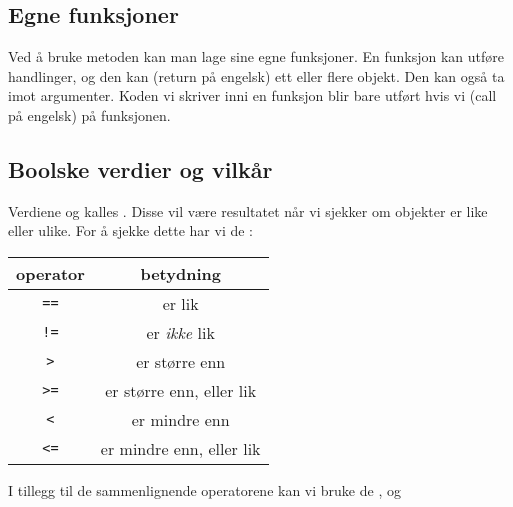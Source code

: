 \newpage
\subsection{Egne funksjoner}
Ved å bruke metoden  kan man lage sine egne funksjoner. En funksjon kan utføre handlinger, og den kan  (return på engelsk) ett eller flere objekt. Den kan også ta imot argumenter. Koden vi skriver inni en funksjon blir bare utført hvis vi  (call på engelsk) på funksjonen. \regv


\subsection{Boolske verdier og vilkår}
Verdiene  og  kalles . Disse vil være resultatet når vi sjekker om objekter er like eller ulike. For å sjekke dette har vi de :
\begin{center}
	\begin{tabular}{c|c}
		\textbf{operator} & \textbf{betydning} \\ \hline
		\texttt{==}	& er lik \\ \rowcolor{gray!10}
		\texttt{!=} & er \textsl{ikke} lik\\
		\texttt{>} & er større enn \\ \rowcolor{gray!10}
		\texttt{>=} & er større enn, eller lik \\
		\texttt{<} & er mindre enn \\ \rowcolor{gray!10}
		\texttt{<=} & er mindre enn, eller lik \\		
	\end{tabular}
\end{center}
\vsk

I tillegg til de sammenlignende operatorene kan vi bruke de  ,  og 
